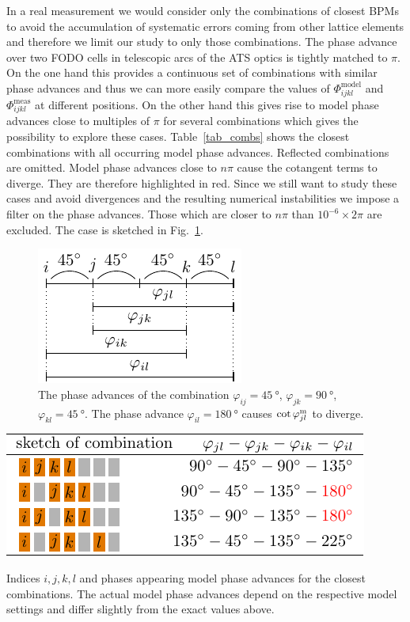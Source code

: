 In a real measurement we would consider only the combinations of closest BPMs to avoid the
accumulation of systematic errors coming from other lattice elements and therefore we limit our study
to only those combinations.
The phase advance over two FODO cells in telescopic arcs of the ATS optics is tightly matched
to $\pi$. On the one hand this provides a continuous set of combinations with
similar phase advances and thus we can more easily compare the values of $\Phi_{ijkl}^\text{model}$
and $\Phi_{ijkl}^\text{meas}$ at different positions.
On the other hand this gives rise to model phase advances close to multiples of $\pi$ for several
combinations which gives the possibility to explore these cases.
Table~\ref{tab_combs} shows the closest combinations with all occurring model phase advances.
Reflected combinations are omitted. Model phase advances close to $n\pi $ cause the cotangent
terms to diverge. They are therefore highlighted in red.
Since we still want to study these cases and avoid divergences and the resulting numerical instabilities
we impose a filter on the phase advances. 
Those which are closer to $n\pi$ than $10^{-6}\times 2\pi$ are excluded. 
The case  is sketched in Fig.~\ref{fig_thetacomb_ij-kl}.
%
\begin{figure}
  \centering
  \includegraphics[width=.4\linewidth]{figThetacombijkl}
  \caption{The phase advances of the combination
    $\varphi_{ij}=\SI{45}{\degree}$, $\varphi_{jk}=\SI{90}{\degree}$, $ \varphi_{kl}=\SI{45}{\degree}$.
The phase advance $\varphi_{il} = \SI{180}{\degree}$ causes $\cot\varphi_{jl}^\text{m}$ to diverge.
  }
  \label{fig_thetacomb_ij-kl}
\end{figure}
%

\begin{table}[htbp]
    \begin{center}
    \includegraphics{figTable1}
    \end{center}
    \caption{Indices $i,j,k,l$ and phases appearing model phase advances for the closest combinations.
      The actual model phase advances depend on the respective model settings and differ slightly from
      the exact values above.
    }
    \label{tab_combs}
\end{table}

